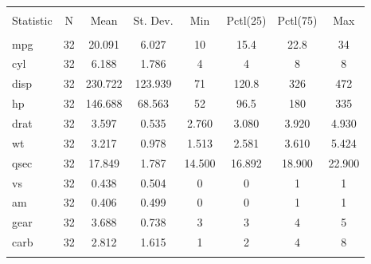 
\begin{table}[!htbp] \centering 
  \caption{} 
  \label{} 
\begin{tabular}{@{\extracolsep{5pt}}lccccccc} 
\\[-1.8ex]\hline 
\hline \\[-1.8ex] 
Statistic & \multicolumn{1}{c}{N} & \multicolumn{1}{c}{Mean} & \multicolumn{1}{c}{St. Dev.} & \multicolumn{1}{c}{Min} & \multicolumn{1}{c}{Pctl(25)} & \multicolumn{1}{c}{Pctl(75)} & \multicolumn{1}{c}{Max} \\ 
\hline \\[-1.8ex] 
mpg & 32 & 20.091 & 6.027 & 10 & 15.4 & 22.8 & 34 \\ 
cyl & 32 & 6.188 & 1.786 & 4 & 4 & 8 & 8 \\ 
disp & 32 & 230.722 & 123.939 & 71 & 120.8 & 326 & 472 \\ 
hp & 32 & 146.688 & 68.563 & 52 & 96.5 & 180 & 335 \\ 
drat & 32 & 3.597 & 0.535 & 2.760 & 3.080 & 3.920 & 4.930 \\ 
wt & 32 & 3.217 & 0.978 & 1.513 & 2.581 & 3.610 & 5.424 \\ 
qsec & 32 & 17.849 & 1.787 & 14.500 & 16.892 & 18.900 & 22.900 \\ 
vs & 32 & 0.438 & 0.504 & 0 & 0 & 1 & 1 \\ 
am & 32 & 0.406 & 0.499 & 0 & 0 & 1 & 1 \\ 
gear & 32 & 3.688 & 0.738 & 3 & 3 & 4 & 5 \\ 
carb & 32 & 2.812 & 1.615 & 1 & 2 & 4 & 8 \\ 
\hline \\[-1.8ex] 
\end{tabular} 
\end{table} 
